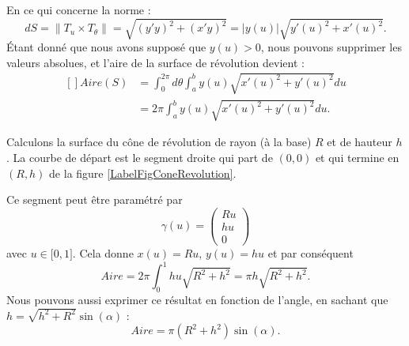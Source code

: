 En ce qui concerne la norme :
\begin{equation}
    dS=\| T_u\times T_{\theta} \|=\sqrt{(y'y)^2+(x'y)^2}=| y(u) |\sqrt{y'(u)^2+x'(u)^2}.
\end{equation}
Étant donné que nous avons supposé que $y(u)>0$, nous pouvons supprimer les valeurs absolues, et l'aire de la surface de révolution devient :
\begin{equation}
    \begin{aligned}[]
        Aire(S)&=\int_0^{2\pi}d\theta\int_a^b y(u)\sqrt{x'(u)^2+y'(u)^2}du\\
        &=2\pi\int_a^b y(u)\sqrt{x'(u)^2+y'(u)^2}du.
    \end{aligned}
\end{equation}

\begin{example}
    Calculons la surface du cône de révolution de rayon (à la base) $R$ et de hauteur $h$. La courbe de départ est le segment droite qui part de $(0,0)$ et qui termine en $(R,h)$ de la figure \ref{LabelFigConeRevolution}.
    \newcommand{\CaptionFigConeRevolution}{En faisant tourner cette droite autour de l'axe $X$, nous obtenons un cône.}
    
    Ce segment peut être paramétré par
    \begin{equation}
        \gamma(u)=\begin{pmatrix}
            Ru    \\ 
            hu    \\ 
            0    
        \end{pmatrix}
    \end{equation}
    avec $u\in\mathopen[ 0 , 1 \mathclose]$. Cela donne $x(u)=Ru$, $y(u)=hu$ et par conséquent
    \begin{equation}
        Aire=2\pi\int_0^1hu\sqrt{R^2+h^2}=\pi h\sqrt{R^2+h^2}.
    \end{equation}
    Nous pouvons aussi exprimer ce résultat en fonction de l'angle, en sachant que $h=\sqrt{h^2+R^2}\sin(\alpha)$ :
    \begin{equation}
        Aire=\pi(R^2+h^2)\sin(\alpha).
    \end{equation}
    
\end{example}

